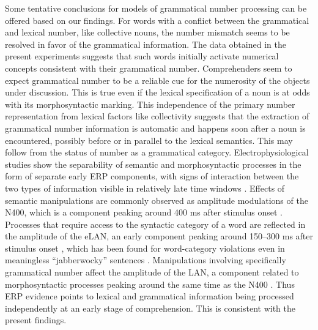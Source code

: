 \documentclass[output=paper]{langscibook}
\begin{document}
Some tentative conclusions for models of grammatical number processing can be offered based on our findings. For words with a conflict between the grammatical and lexical number, like collective nouns, the number mismatch seems to be resolved in favor of the grammatical information. The data obtained in the present experiments suggests that such words initially activate numerical concepts consistent with their grammatical number. Comprehenders seem to expect grammatical number to be a reliable cue for the numerosity of the objects under discussion. This is true even if the lexical specification of a noun is at odds with its morphosyntactic marking. This independence of the primary number representation from lexical factors like collectivity suggests that the extraction of grammatical number information is automatic and happens soon after a noun is encountered, possibly before or in parallel to the lexical semantics. This may follow from the status of number as a grammatical category. Electrophysiological studies show the separability of semantic and morphosyntactic processes in the form of separate early ERP components, with signs of interaction between the two types of information visible in relatively late time windows \citep{aFriedericineuralbasisauditory2002}. Effects of semantic manipulations are commonly observed as amplitude modulations of the N400, which is a component peaking around 400 ms after stimulus onset \citep{aKutasThirtyyearscounting2011}. Processes that require access to the syntactic category of a word are reflected in the amplitude of the eLAN, an early component peaking around 150--300 ms after stimulus onset \citep{aHahneElectrophysiologicalevidencetwo1999}, which has been found for word-category violations even in meaningless “jabberwocky” sentences \citep{aHahneWhatleftif2001}. Manipulations involving specifically grammatical number affect the amplitude of the LAN, a component related to morphosyntactic processes \citep{munteBrainActivityAssociated1997,friedericiTimeCourseSyntactic1995} peaking around the same time as the N400 \citep{aBarberGrammaticalgendernumber2005,aLuckBrainpotentialsmorphologically2006}.\footnotemark{} Thus ERP evidence points to lexical and grammatical information being processed independently at an early stage of comprehension. This is consistent with the present findings.
\end{document}
